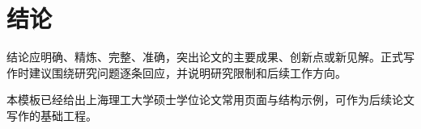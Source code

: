 \chapter{结论}

结论应明确、精炼、完整、准确，突出论文的主要成果、创新点或新见解。正式写作时建议围绕研究问题逐条回应，并说明研究限制和后续工作方向。

本模板已经给出上海理工大学硕士学位论文常用页面与结构示例，可作为后续论文写作的基础工程。
